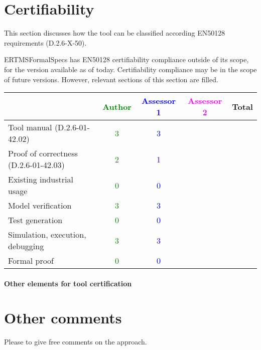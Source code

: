 \section{Certifiability}

This section discusses how the tool can be classified according EN50128 requirements (D.2.6-X-50).

\begin{author_comment}
ERTMSFormalSpecs has EN50128 certifiability compliance outside of its scope, for the version available as of today. Certifiability compliance may be in the scope of future versions. However, relevant sections of this section are filled.
\end{author_comment}

\begin{tabular}{|l | c | c | c | c|}
\hline
& \textcolor{green}{Author} & \textcolor{blue}{Assessor 1} & \textcolor{magenta}{Assessor 2} & Total \\
\hline 
Tool manual (D.2.6-01-42.02) & \textcolor{green}{3} & \textcolor{blue}{3} & &  \\
\hline
Proof of correctness (D.2.6-01-42.03) & \textcolor{green}{2} & \textcolor{blue}{1} & & \\
\hline
Existing industrial  usage &  \textcolor{green}{0} & \textcolor{blue}{0} & & \\
\hline
Model verification & \textcolor{green}{3} & \textcolor{blue}{3} & & \\
\hline
Test generation & \textcolor{green}{0} & \textcolor{blue}{0} & & \\
\hline
Simulation, execution, debugging & \textcolor{green}{3} & \textcolor{blue}{3} & & \\
\hline
Formal proof & \textcolor{green}{0} & \textcolor{blue}{0} & & \\
\hline
\end{tabular}

\paragraph{Other elements for tool certification}

\section{Other comments}
Please to  give free comments on the approach.

